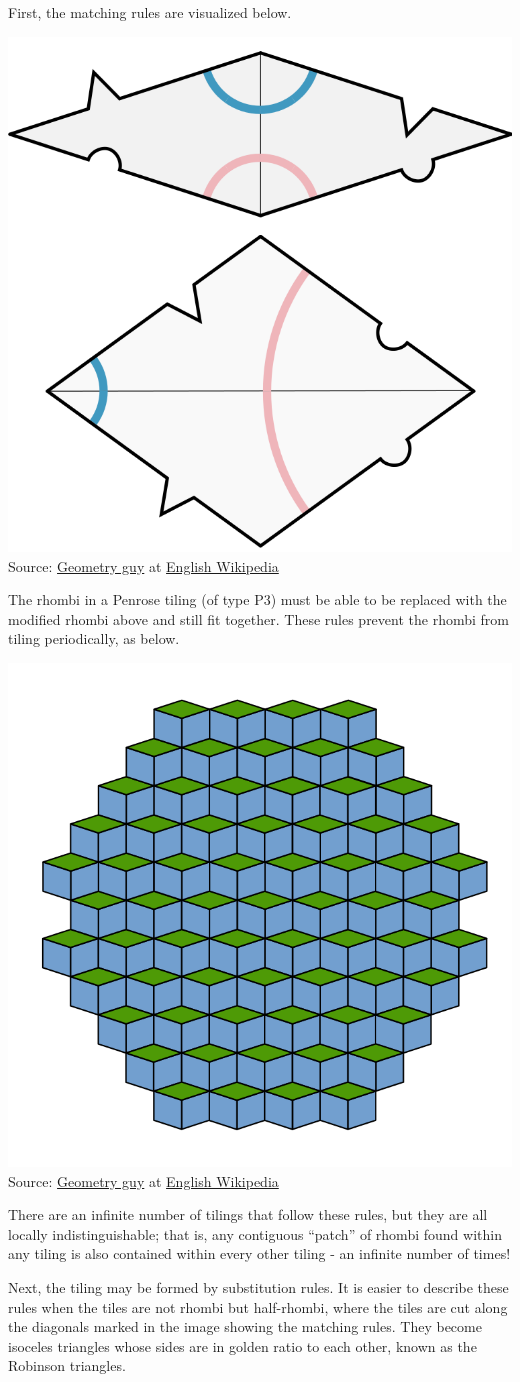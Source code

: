 \documentclass{article}
\begin{document}
First, the matching rules are visualized below.
\begin{center}
  \includegraphics[width=0.25\linewidth]{matching.png}\\
  Source: \href{https://en.wikipedia.org/wiki/User:Geometry_guy}{Geometry guy}
  at \href{https://en.wikipedia.org/wiki/}{English Wikipedia}
\end{center}
The rhombi in a Penrose tiling (of type P3)
must be able to be replaced with the modified rhombi above and still fit together.
These rules prevent the rhombi from tiling periodically, as below.
\begin{center}
  \includegraphics[width=0.25\linewidth]{periodic.png}\\
  Source: \href{https://en.wikipedia.org/wiki/User:Geometry_guy}{Geometry guy}
  at \href{https://en.wikipedia.org/wiki/}{English Wikipedia}
\end{center}

There are an infinite number of tilings that follow these rules,
but they are all locally indistinguishable;
that is, any contiguous ``patch'' of rhombi
found within any tiling
is also contained within every other tiling -
an infinite number of times!

Next, the tiling may be formed by substitution rules.
It is easier to describe these rules
when the tiles are not rhombi but half-rhombi,
where the tiles are cut along the diagonals
marked in the image showing the matching rules.
They become isoceles triangles
whose sides are in golden ratio to each other,
known as the Robinson triangles.
\end{document}
